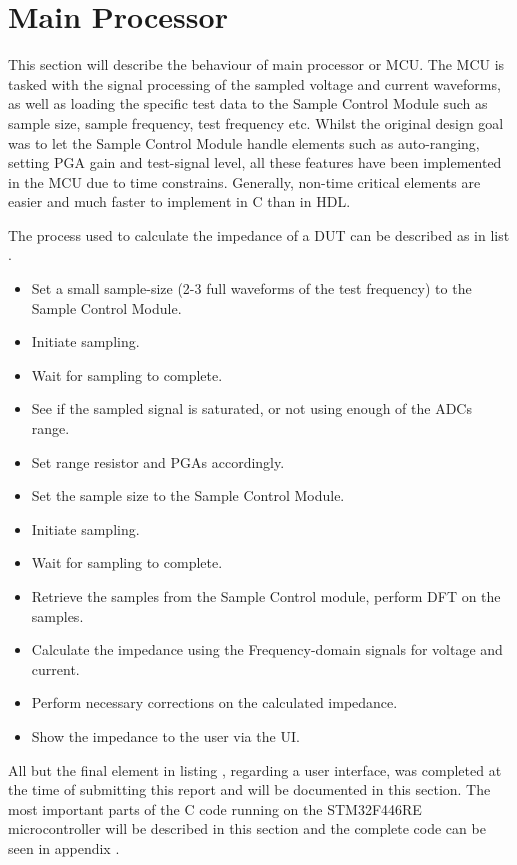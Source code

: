 \section{Main Processor} \label{sec:MCU}
This section will describe the behaviour of main processor or MCU. The MCU is tasked with the signal processing of the sampled voltage and current waveforms, as well as loading the specific test data to the Sample Control Module such as sample size, sample frequency, test frequency etc. Whilst the original design goal was to let the Sample Control Module handle elements such as auto-ranging, setting PGA gain and test-signal level, all these features have been implemented in the MCU due to time constrains. Generally, non-time critical elements are easier and much faster to implement in C than in HDL.

The process used to calculate the impedance of a DUT can be described as in list .
\begin{itemize}
\label{lst_7_3}
    \item Set a small sample-size (2-3 full waveforms of the test frequency) to the Sample Control Module.
    \item Initiate sampling.
    \item Wait for sampling to complete. 
    \item See if the sampled signal is saturated, or not using enough of the ADCs range.
    \item Set range resistor and PGAs accordingly.
    \item Set the sample size to the Sample Control Module.
    \item Initiate sampling.
    \item Wait for sampling to complete. 
    \item Retrieve the samples from the Sample Control module, perform DFT on the samples.
    \item Calculate the impedance using the Frequency-domain signals for voltage and current. 
    \item Perform necessary corrections on the calculated impedance. 
    \item Show the impedance to the user via the UI.
\end{itemize}

All but the final element in listing , regarding a user interface, was completed at the time of submitting this report and will be documented in this section. The most important parts of the C code running on the STM32F446RE microcontroller will be described in this section and the complete code can be seen in appendix .

